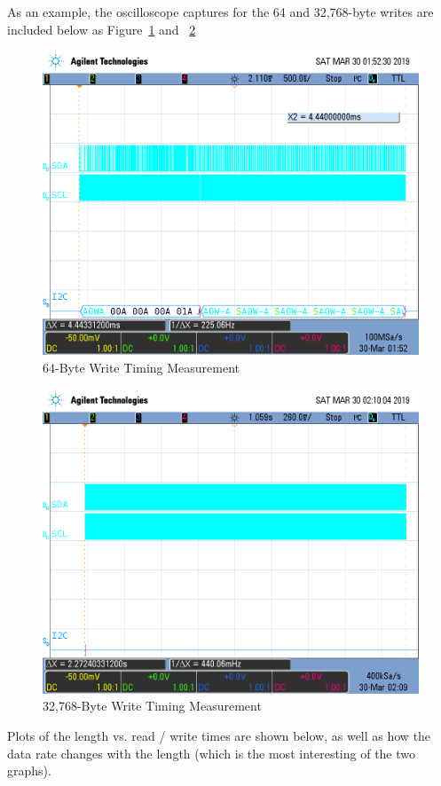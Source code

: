 \documentclass[a4paper, 12pt]{article}
\begin{document}
As an example, the oscilloscope captures for the 64 and 32,768-byte writes are included below as Figure~\ref{fig:scope21} and ~\ref{fig:scope37}

\begin{figure}[H]
\centering
\includegraphics[width=.8\textwidth]{scope_21.png}
\caption{64-Byte Write Timing Measurement}
\label{fig:scope21}
\end{figure}

\begin{figure}[H]
\centering
\includegraphics[width=.8\textwidth]{scope_37.png}
\caption{32,768-Byte Write Timing Measurement}
\label{fig:scope37}
\end{figure}

Plots of the length vs. read / write times are shown below, as well as how the data rate changes with the length (which is the most interesting of the two graphs).
\end{document}
